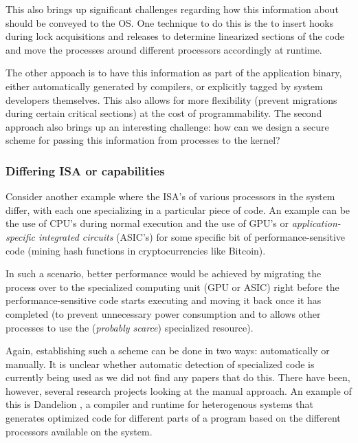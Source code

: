 This also brings up significant challenges regarding how this information about should be conveyed to the OS. One technique to do this is the to insert hooks during lock acquisitions and releases to determine linearized sections of the code and move the processes around different processors accordingly at runtime.

The other appoach is to have this information as part of the application binary, either automatically generated by compilers, or explicitly tagged by system developers themselves. This also allows for more flexibility (\eg prevent migrations during certain critical sections) at the cost of programmability. The second approach also brings up an interesting challenge: how can we design a secure scheme for passing this information from processes to the kernel?


\subsubsection{Differing ISA or capabilities}
Consider another example where the ISA's of various processors in the system differ, with each one specializing in a particular piece of code. An example can be the use of CPU's during normal execution and the use of GPU's or \emph{application-specific integrated circuits} (ASIC's) for some specific bit of performance-sensitive code (\eg mining hash functions in cryptocurrencies like Bitcoin).

In such a scenario, better performance would be achieved by migrating the process over to the specialized computing unit (GPU or ASIC) right before the performance-sensitive code starts executing and moving it back once it has completed (to prevent unnecessary power consumption and to allows other processes to use the (\emph{probably scarce}) specialized resource).

Again, establishing such a scheme can be done in two ways: automatically or manually. It is unclear whether automatic detection of specialized code is currently being used as we did not find any papers that do this. There have been, however, several research projects looking at the manual approach. An example of this is Dandelion \cite{Dandelion}, a compiler and runtime for heterogenous systems that generates optimized code for different parts of a program based on the different processors available on the system.

